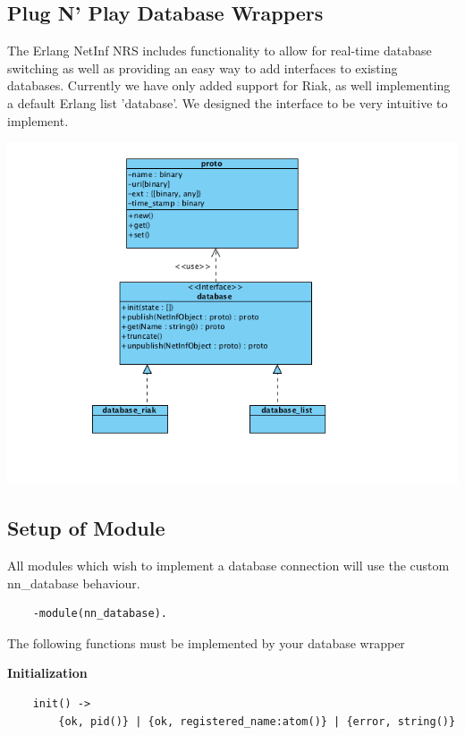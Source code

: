 \subsection {Plug N' Play Database Wrappers}

The Erlang NetInf NRS includes functionality to allow for real-time database switching as well as providing an easy way to add interfaces to existing databases. Currently we have only added support for Riak, as well implementing a default Erlang list 'database'.  We designed the interface to be very intuitive to implement.

\includegraphics[scale=0.5]{./img/database_api.png}

\subsection {Setup of Module}

All modules which wish to implement a database connection will use the custom nn\_database behaviour.

\begin {verbatim}
    -module(nn_database).
\end{verbatim}

The following functions must be implemented by your database wrapper

\textbf{Initialization}

\begin {verbatim}
    init() -> 
    	{ok, pid()} | {ok, registered_name:atom()} | {error, string()}
\end{verbatim}

